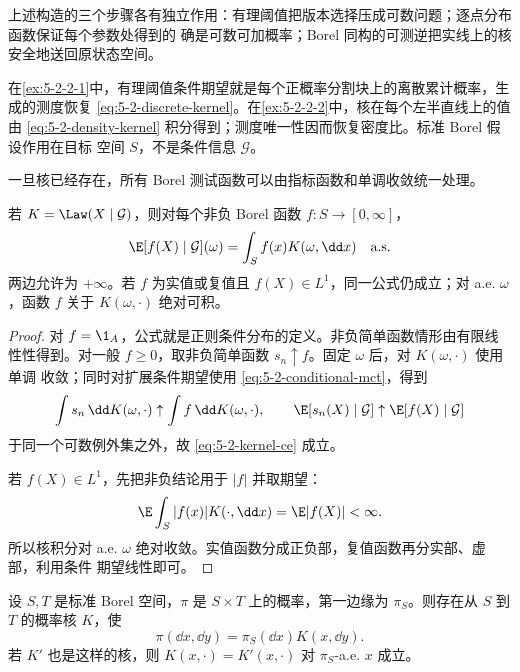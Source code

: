 \begin{remark}[正则条件分布构造的三个步骤]\label{rem:5-2-2-existence-checkpoints}
上述构造的三个步骤各有独立作用：有理阈值把版本选择压成可数问题；逐点分布函数保证每个参数处得到的
确是可数可加概率；Borel 同构的可测逆把实线上的核安全地送回原状态空间。

在\cref{ex:5-2-2-1}中，有理阈值条件期望就是每个正概率分割块上的离散累计概率，生成的测度恢复
\eqref{eq:5-2-discrete-kernel}。在\cref{ex:5-2-2-2}中，核在每个左半直线上的值由
\eqref{eq:5-2-density-kernel} 积分得到；测度唯一性因而恢复密度比。标准 Borel 假设作用在目标
空间 $S$，不是条件信息 $\mathcal G$。
\end{remark}

一旦核已经存在，所有 Borel 测试函数可以由指标函数和单调收敛统一处理。

\begin{theorem}[核表示条件期望]\label{theorem:5-2-2-2}
若 $K=\Law(X\mid\mathcal G)$，则对每个非负 Borel 函数 $f:S\to[0,\infty]$，
\begin{equation}\label{eq:5-2-kernel-ce}
 \E[f(X)\mid\mathcal G](\omega)
 =\int_Sf(x)K(\omega,\dd x)\quad\text{a.s.}
\end{equation}
两边允许为 $+\infty$。若 $f$ 为实值或复值且 $f(X)\in L^1$，同一公式仍成立；对 a.e.
$\omega$，函数 $f$ 关于 $K(\omega,\cdot)$ 绝对可积。
\end{theorem}

\begin{proof}
对 $f=\1_A$，公式就是正则条件分布的定义。非负简单函数情形由有限线性性得到。对一般
$f\geq0$，取非负简单函数 $s_n\uparrow f$。固定 $\omega$ 后，对 $K(\omega,\cdot)$ 使用单调
收敛；同时对扩展条件期望使用 \eqref{eq:5-2-conditional-mct}，得到
\[
 \int s_n\,\dd K(\omega,\cdot)\uparrow\int f\,\dd K(\omega,\cdot),
 \qquad
 \E[s_n(X)\mid\mathcal G]\uparrow\E[f(X)\mid\mathcal G]
\]
于同一个可数例外集之外，故 \eqref{eq:5-2-kernel-ce} 成立。

若 $f(X)\in L^1$，先把非负结论用于 $|f|$ 并取期望：
\[
 \E\int_S|f(x)|K(\cdot,\dd x)=\E|f(X)|<\infty.
\]
所以核积分对 a.e. $\omega$ 绝对收敛。实值函数分成正负部，复值函数再分实部、虚部，利用条件
期望线性即可。
\end{proof}

\begin{theorem}[测度分解定理]\label{theorem:5-2-2-3}
设 $S,T$ 是标准 Borel 空间，$\pi$ 是 $S\times T$ 上的概率，第一边缘为 $\pi_S$。则存在从
$S$ 到 $T$ 的概率核 $K$，使
\[
 \pi(\dd x,\dd y)=\pi_S(\dd x)K(x,\dd y).
\]
若 $K'$ 也是这样的核，则
$K(x,\cdot)=K'(x,\cdot)$ 对 $\pi_S$-a.e. $x$ 成立。
\end{theorem}

